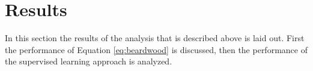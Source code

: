 \section{Results}
In this section the results of the analysis that is described above is laid out. First the performance of Equation
\ref{eq:beardwood} is discussed, then the performance of the supervised learning approach is analyzed.



